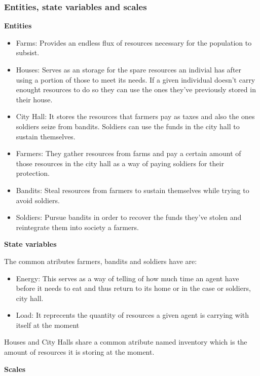 \documentclass{wscpaperproc}
\theoremstyle{wsc}
\begin{document}
\subsubsection{Entities, state variables and scales}
\noindent \textbf{Entities}

\begin{itemize}
    \item Farms: Provides an endless flux of resources necessary for the population to subsist.
    \item Houses: Serves as an storage for the spare resources an indivial has after using a portion
          of those to meet its needs. If a given individual doesn't carry enought resources
          to do so they can use the ones they've previously stored in their house.
    \item City Hall: It stores the resources that farmers pay as taxes and also the ones soldiers
          seize from bandits. Soldiers can use the funds in the city hall to sustain themselves.
    \item Farmers: They gather resources from farms and pay a certain amount of those resources in the
          city hall as a way of paying soldiers for their protection.
    \item Bandits: Steal resources from farmers to sustain themselves while trying to avoid soldiers.
    \item Soldiers: Pursue bandits in order to recover the funds they've stolen and reintegrate them
          into society a farmers.
\end{itemize}

\noindent \textbf{State variables}

\noindent The common atributes farmers, bandits and soldiers have are:

\begin{itemize}
    \item Energy: This serves as a way of telling of how much time an agent have before it needs to
          eat and thus return to its home or in the case or soldiers, city hall.
    \item Load: It reprecents the quantity of resources a given agent is carrying with itself at the
          moment
\end{itemize}

\noindent Houses and City Halls share a common atribute named inventory which is the amount of
resources it is storing at the moment.\hfill\break

\noindent \textbf{Scales}
\end{document}
